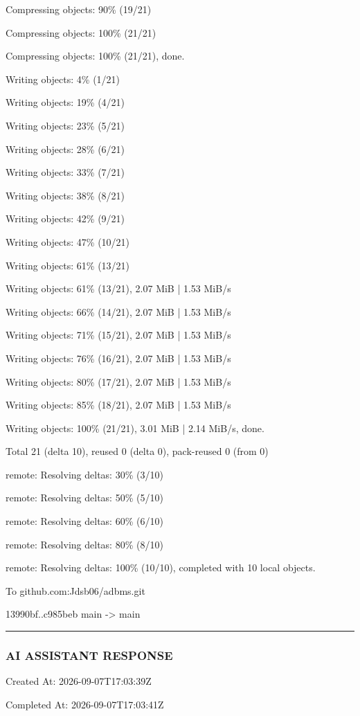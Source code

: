 \documentclass[11pt,a4paper]{article}
\begin{document}
Compressing objects:  90\% (19/21)

Compressing objects: 100\% (21/21)

Compressing objects: 100\% (21/21), done.

Writing objects:   4\% (1/21)

Writing objects:  19\% (4/21)

Writing objects:  23\% (5/21)

Writing objects:  28\% (6/21)

Writing objects:  33\% (7/21)

Writing objects:  38\% (8/21)

Writing objects:  42\% (9/21)

Writing objects:  47\% (10/21)

Writing objects:  61\% (13/21)

Writing objects:  61\% (13/21), 2.07 MiB | 1.53 MiB/s

Writing objects:  66\% (14/21), 2.07 MiB | 1.53 MiB/s

Writing objects:  71\% (15/21), 2.07 MiB | 1.53 MiB/s

Writing objects:  76\% (16/21), 2.07 MiB | 1.53 MiB/s

Writing objects:  80\% (17/21), 2.07 MiB | 1.53 MiB/s

Writing objects:  85\% (18/21), 2.07 MiB | 1.53 MiB/s

Writing objects: 100\% (21/21), 3.01 MiB | 2.14 MiB/s, done.

Total 21 (delta 10), reused 0 (delta 0), pack-reused 0 (from 0)

remote: Resolving deltas:  30\% (3/10)

remote: Resolving deltas:  50\% (5/10)

remote: Resolving deltas:  60\% (6/10)

remote: Resolving deltas:  80\% (8/10)

remote: Resolving deltas: 100\% (10/10), completed with 10 local objects.

To github.com:Jdsb06/adbms.git

13990bf..c985beb  main -> main


\hrule

\subsubsection{AI ASSISTANT RESPONSE}

Created At: 2026-09-07T17:03:39Z

Completed At: 2026-09-07T17:03:41Z
\end{document}

